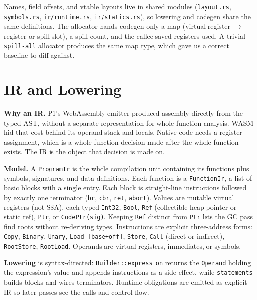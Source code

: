 \documentclass[10pt]{article}
\newcommand{\code}[1]{\texttt{\small #1}}
\begin{document}
Names, field offsets, and vtable layouts live in shared modules (\code{layout.rs}, \code{symbols.rs}, \code{ir/runtime.rs}, \code{ir/statics.rs}), so lowering and codegen share the same definitions. The allocator hands codegen only a map (virtual register $\mapsto$ register or spill slot), a spill count, and the callee-saved registers used. A trivial \code{--spill-all} allocator produces the same map type, which gave us a correct baseline to diff against.

\section{IR and Lowering}
\textbf{Why an IR.} P1's WebAssembly emitter produced assembly directly from the typed AST, without a separate representation for whole-function analysis. WASM hid that cost behind its operand stack and locals. Native code needs a register assignment, which is a whole-function decision made after the whole function exists. The IR is the object that decision is made on.

\textbf{Model.} A \code{ProgramIr} is the whole compilation unit containing its functions plus symbols, signatures, and data definitions. Each function is a \code{FunctionIr}, a list of basic blocks with a single entry. Each block is straight-line instructions followed by exactly one terminator (\code{br}, \code{cbr}, \code{ret}, \code{abort}). Values are mutable virtual registers (not SSA), each typed \code{Int32}, \code{Bool}, \code{Ref} (collectible heap pointer or static ref), \code{Ptr}, or \code{CodePtr(sig)}. Keeping \code{Ref} distinct from \code{Ptr} lets the GC pass find roots without re-deriving types. Instructions are explicit three-address forms: \code{Copy}, \code{Binary}, \code{Unary}, \code{Load [base+off]}, \code{Store}, \code{Call} (direct or indirect), \code{RootStore}, \code{RootLoad}. Operands are virtual registers, immediates, or symbols.

\textbf{Lowering} is syntax-directed: \code{Builder::expression} returns the \code{Operand} holding the expression's value and appends instructions as a side effect, while \code{statements} builds blocks and wires terminators. Runtime obligations are emitted as explicit IR so later passes see the calls and control flow.
\end{document}
